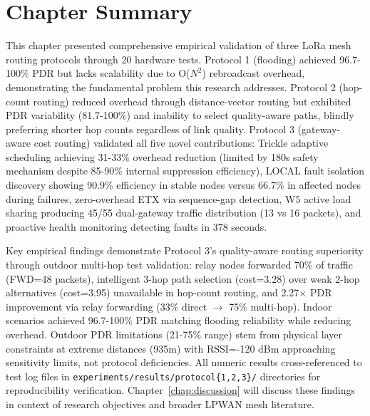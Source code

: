 \section{Chapter Summary}

This chapter presented comprehensive empirical validation of three LoRa mesh routing protocols through 20 hardware tests. Protocol 1 (flooding) achieved 96.7-100\% PDR but lacks scalability due to O($N^2$) rebroadcast overhead, demonstrating the fundamental problem this research addresses. Protocol 2 (hop-count routing) reduced overhead through distance-vector routing but exhibited PDR variability (81.7-100\%) and inability to select quality-aware paths, blindly preferring shorter hop counts regardless of link quality. Protocol 3 (gateway-aware cost routing) validated all five novel contributions: Trickle adaptive scheduling achieving 31-33\% overhead reduction (limited by 180s safety mechanism despite 85-90\% internal suppression efficiency), LOCAL fault isolation discovery showing 90.9\% efficiency in stable nodes versus 66.7\% in affected nodes during failures, zero-overhead ETX via sequence-gap detection, W5 active load sharing producing 45/55 dual-gateway traffic distribution (13 vs 16 packets), and proactive health monitoring detecting faults in 378 seconds.

Key empirical findings demonstrate Protocol 3's quality-aware routing superiority through outdoor multi-hop test validation: relay nodes forwarded 70\% of traffic (FWD=48 packets), intelligent 3-hop path selection (cost=3.28) over weak 2-hop alternatives (cost=3.95) unavailable in hop-count routing, and 2.27$\times$ PDR improvement via relay forwarding (33\% direct $\rightarrow$ 75\% multi-hop). Indoor scenarios achieved 96.7-100\% PDR matching flooding reliability while reducing overhead. Outdoor PDR limitations (21-75\% range) stem from physical layer constraints at extreme distances (935m) with RSSI=-120 dBm approaching sensitivity limits, not protocol deficiencies. All numeric results cross-referenced to test log files in \texttt{experiments/results/protocol\{1,2,3\}/} directories for reproducibility verification. Chapter~\ref{chap:discussion} will discuss these findings in context of research objectives and broader LPWAN mesh literature.

